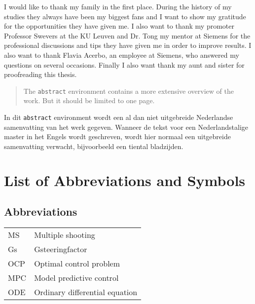 \documentclass[master=elt,masteroption=eg,english]{kulemt}
\begin{document}

\begin{preface}
	I would like to thank my family in the first place. During the history of my studies they always have been my biggest fans and I want to show my gratitude for the opportunities they have given me. I also want to thank my promoter Professor Swevers at the KU Leuven and Dr. Tong my mentor at Siemens for the professional discussions and tips they have given me in order to improve results. I also want to thank Flavia Acerbo, an employee at Siemens, who answered my questions on several occasions. Finally I also want thank my aunt and sister for proofreading this thesis.

\end{preface}

\tableofcontents*

\begin{abstract}
  The \texttt{abstract} environment contains a more extensive overview of
  the work. But it should be limited to one page.

  \lipsum[1]
\end{abstract}

\begin{abstract*}
  In dit \texttt{abstract} environment wordt een al dan niet uitgebreide
  Nederlandse samenvatting van het werk gegeven.
  Wanneer de tekst voor een Nederlandstalige master in het Engels wordt
  geschreven, wordt hier normaal een uitgebreide samenvatting verwacht,
  bijvoorbeeld een tiental bladzijden. 

  \lipsum[1]
\end{abstract*}

\listoffiguresandtables
\chapter{List of Abbreviations and Symbols}
\section*{Abbreviations}
\begin{flushleft}
  \renewcommand{\arraystretch}{1.1}
  \begin{tabularx}{\textwidth}{@{}p{12mm}X@{}}
    MS   & Multiple shooting  \\
    Gs   & Gsteeringfactor  \\
    OCP  & Optimal control problem\\
    MPC  & Model predictive control\\
    ODE  & Ordinary differential equation
  \end{tabularx}
\end{flushleft}
\end{document}
